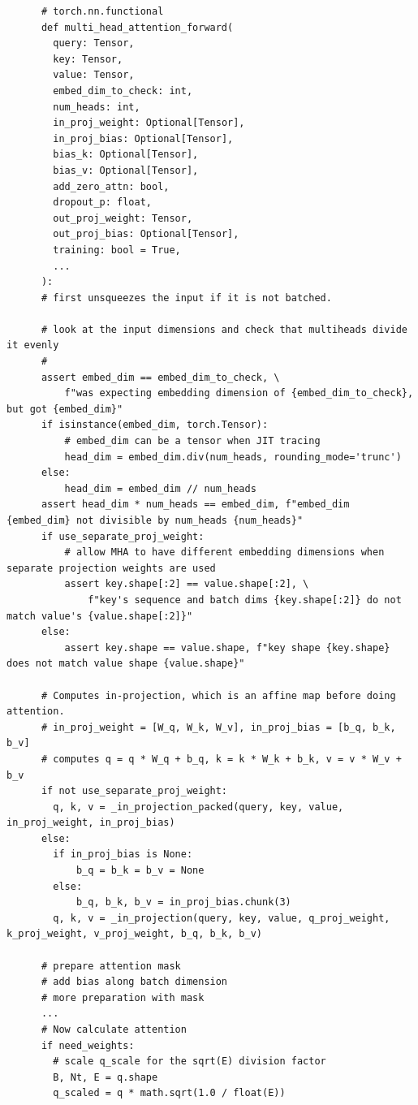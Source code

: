     \begin{lstlisting}
      # torch.nn.functional 
      def multi_head_attention_forward(
        query: Tensor,
        key: Tensor,
        value: Tensor,
        embed_dim_to_check: int,
        num_heads: int,
        in_proj_weight: Optional[Tensor],
        in_proj_bias: Optional[Tensor],
        bias_k: Optional[Tensor],
        bias_v: Optional[Tensor],
        add_zero_attn: bool,
        dropout_p: float,
        out_proj_weight: Tensor,
        out_proj_bias: Optional[Tensor],
        training: bool = True,
        ...
      ): 
      # first unsqueezes the input if it is not batched. 

      # look at the input dimensions and check that multiheads divide it evenly 
      #  
      assert embed_dim == embed_dim_to_check, \
          f"was expecting embedding dimension of {embed_dim_to_check}, but got {embed_dim}"
      if isinstance(embed_dim, torch.Tensor):
          # embed_dim can be a tensor when JIT tracing
          head_dim = embed_dim.div(num_heads, rounding_mode='trunc')
      else:
          head_dim = embed_dim // num_heads
      assert head_dim * num_heads == embed_dim, f"embed_dim {embed_dim} not divisible by num_heads {num_heads}"
      if use_separate_proj_weight:
          # allow MHA to have different embedding dimensions when separate projection weights are used
          assert key.shape[:2] == value.shape[:2], \
              f"key's sequence and batch dims {key.shape[:2]} do not match value's {value.shape[:2]}"
      else:
          assert key.shape == value.shape, f"key shape {key.shape} does not match value shape {value.shape}"

      # Computes in-projection, which is an affine map before doing attention. 
      # in_proj_weight = [W_q, W_k, W_v], in_proj_bias = [b_q, b_k, b_v] 
      # computes q = q * W_q + b_q, k = k * W_k + b_k, v = v * W_v + b_v
      if not use_separate_proj_weight:
        q, k, v = _in_projection_packed(query, key, value, in_proj_weight, in_proj_bias)
      else:
        if in_proj_bias is None:
            b_q = b_k = b_v = None
        else:
            b_q, b_k, b_v = in_proj_bias.chunk(3)
        q, k, v = _in_projection(query, key, value, q_proj_weight, k_proj_weight, v_proj_weight, b_q, b_k, b_v)

      # prepare attention mask 
      # add bias along batch dimension  
      # more preparation with mask
      ... 
      # Now calculate attention
      if need_weights:
        # scale q_scale for the sqrt(E) division factor 
        B, Nt, E = q.shape
        q_scaled = q * math.sqrt(1.0 / float(E))


\end{lstlisting}
